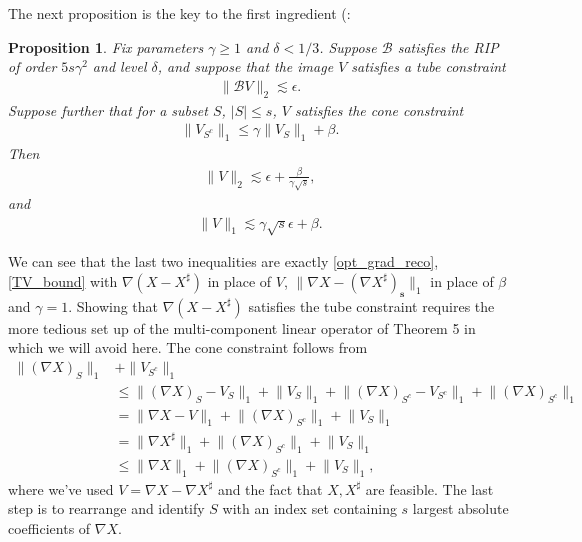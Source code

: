 \documentclass[11pt, oneside]{article}   %
\newtheorem{proposition}[theorem]{Proposition}
\newcommand{\B}{\mathcal{B}}
\newcommand{\norm}[1]{\lVert #1 \rVert}
\newcommand{\abs}[1]{\lvert#1 \rvert}
\begin{document}
The next proposition is the key to the first ingredient (\!\!\cite[Proposition 3]{needell2013stable}: 
\begin{proposition}
        Fix parameters $\gamma \geq 1$ and $\delta < 1/3$. Suppose $\B$ satisfies the RIP of order $5s\gamma^2$ and level $\delta$, and suppose that the image $V$ satisfies a tube constraint 
\begin{align*}
\norm{\B V}_2 \lesssim \epsilon.
\end{align*}
Suppose further that for a subset $S$, $\abs{S} \leq s$, $V$ satisfies the cone constraint 
\begin{align*}
        \norm{V_{S^c}}_1 \leq \gamma \norm{V_S}_1 + \beta.
\end{align*}
Then 
\begin{align*}
        \norm{V}_2 \lesssim \epsilon + \frac{\beta}{\gamma\sqrt{s}},
\end{align*}
and 
\begin{align*}
        \norm{V}_1 \lesssim  \gamma\sqrt{s} \epsilon + \beta.
\end{align*}
\end{proposition}

We can see that the last two inequalities are exactly \eqref{opt_grad_reco}, \eqref{TV_bound} with $\nabla(X-X^\sharp)$ in place of $V$, $\norm{\nabla X - (\nabla X^\sharp)_\mathbf{s}}_1$ in place of $\beta$ and $\gamma = 1$. Showing that $\nabla(X - X^\sharp)$ satisfies the tube constraint requires the more tedious set up of the multi-component linear operator of Theorem 5 in \cite{needell2013stable} which we will avoid here. The cone constraint follows from 
\begin{align*}
        \norm{(\nabla X)_S}_1 &+ \norm{ V_{S^c}}_1 \\
&\leq \norm{(\nabla X)_S - V_S}_1 + \norm{V_S}_1
+ \norm{(\nabla X)_{S^c} - V_{S^c}}_1 + \norm{(\nabla X)_{S^c}}_1  \\
&= \norm{\nabla X - V}_1 + \norm{(\nabla X)_{S^c}}_1 + \norm{V_S}_1  \\
&= \norm{\nabla X^\sharp}_1 + \norm{(\nabla X)_{S^c}}_1 + \norm{V_S}_1 \\
&\leq \norm{\nabla X}_1 + \norm{(\nabla X)_{S^c}}_1 + \norm{V_S}_1,
\end{align*}
where we've used $V = \nabla X - \nabla X^\sharp$ and the fact that $X, X^\sharp$ are feasible.  The last step is to rearrange and identify $S$ with an index set containing $s$ largest absolute coefficients of $\nabla X$.
\end{document}
